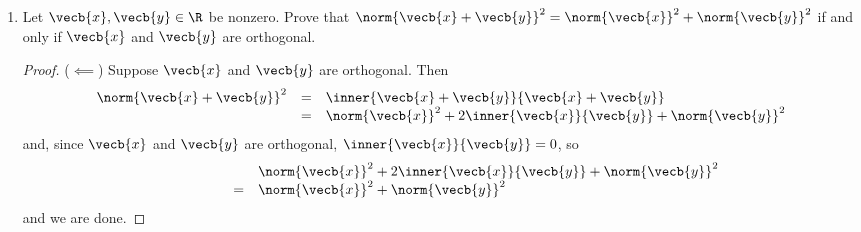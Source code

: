 \documentclass[letterpaper]{article}
\begin{document}
\begin{enumerate}
\begin{proof}
\[\begin{array}{rcl}
0&=&\norm{\vecb{y}}^2
-2\frac{\inner{\vecb{x}}{\vecb{y}}^2}{\norm{\vecb{x}}^2}
+\frac{\inner{\vecb{x}}{\vecb{y}}^2}{\norm{\vecb{x}}^2}\\

0&=&\norm{\vecb{y}}^2-\frac{\inner{\vecb{x}}{\vecb{y}}^2}{\norm{\vecb{x}}^2}\\
\end{array}\]

From this, we can rearrange to find that $\inner{\vecb{x}}{\vecb{y}}^2=\norm{\vecb{x}}^2\norm{\vecb{y}}^2$ and take square roots, yielding $\abs{\inner{\vecb{x}}{\vecb{y}}}=\norm{\vecb{x}}\norm{\vecb{y}}$ and we are done. 
\end{proof}

\begin{proof}($\implies$) Suppose that $\abs{\inner{\vecb{x}}{\vecb{y}}}=\norm{\vecb{x}}\norm{\vecb{y}}$. 

As in the converse direction (with steps reversed), we can square both sides and rearrange to find that 
$$0=\norm{\vecb{y}}^2
-2\left(\frac{\inner{\vecb{x}}{\vecb{y}}}{\norm{\vecb{x}}^2}\right)\inner{\vecb{x}}{\vecb{y}}
+\left(\frac{\inner{\vecb{x}}{\vecb{y}}}{\norm{\vecb{x}}^2}\right)^2\norm{\vecb{x}}^2.$$
Now since we have assumed that $\vecb{x}\neq\vec{0}$, we know that $\frac{\inner{\vecb{x}}{\vecb{y}}}{\norm{\vecb{x}}^2}$ is a real number. So let $r=\frac{\inner{\vecb{x}}{\vecb{y}}}{\norm{\vecb{x}}^2}$ and substitute to obtain 
$$0=\norm{\vecb{y}}^2-2r\inner{\vecb{x}}{\vecb{y}}+r^2\norm{\vecb{x}}^2.$$
Again as we did in the converse direction, we can rearrange to find that $0=\norm{\vecb{y}-r\vecb{x}}^2$. This means that $\vecb{y}=r\vecb{x}$, and we are done. 
\end{proof} 

\item Let $\vecb{x}, \vecb{y} \in \R$ be nonzero. Prove that $\norm{\vecb{x}+\vecb{y}}^2=\norm{\vecb{x}}^2+\norm{\vecb{y}}^2$ if and only if $\vecb{x}$ and $\vecb{y}$ are orthogonal. 

\begin{proof}($\impliedby$) Suppose $\vecb{x}$ and $\vecb{y}$ are orthogonal. Then 
\[\begin{array}{rcl}
\norm{\vecb{x}+\vecb{y}}^2&=&\inner{\vecb{x}+\vecb{y}}{\vecb{x}+\vecb{y}}\\
&=&\norm{\vecb{x}}^2+2\inner{\vecb{x}}{\vecb{y}}+\norm{\vecb{y}}^2\\
\end{array}\]
and, since $\vecb{x}$ and $\vecb{y}$ are orthogonal, $\inner{\vecb{x}}{\vecb{y}}=0$, so 
\[\begin{array}{rcl}
\quad \quad \quad \quad &&\norm{\vecb{x}}^2+2\inner{\vecb{x}}{\vecb{y}}+\norm{\vecb{y}}^2 \\
&=& \norm{\vecb{x}}^2+\norm{\vecb{y}}^2\\
\end{array}\]
and we are done. 
\end{proof}


\end{enumerate}
\end{document}
